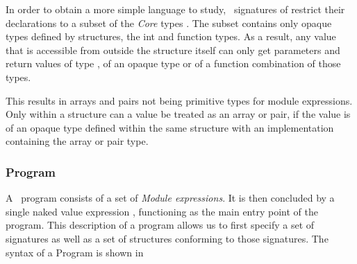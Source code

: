 In order to obtain a more simple language to study, \MiniML\ signatures of restrict their declarations to a subset  of the \emph{Core} types \cmath{\tau}. 
The subset  contains only opaque types defined by structures, the int and function types.
As a result, any value that is accessible from outside the structure itself can only get parameters and return values of type , of an opaque type or of a function combination of those types.

This results in arrays \cmath{[\tau]} and pairs  not being primitive types for module expressions.
Only within a structure can a value be treated as an array or pair, if the value is of an opaque type defined within the same structure with an implementation containing the array or pair type.



\subsubsection{Program}
A \MiniML\ program consists of a set of \emph{Module expressions}.
It is then concluded by a single naked value expression , functioning as the main entry point of the program.
This description of a program allows us to first specify a set of signatures as well as a set of structures conforming to those signatures.
The syntax of a Program is shown in 




